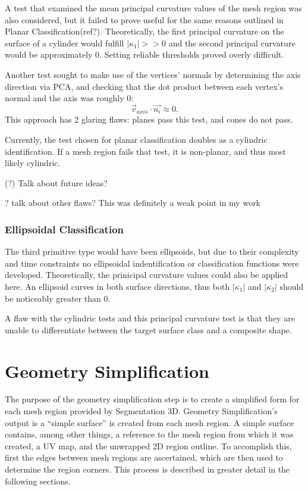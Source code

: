 A test that examined the mean principal curvature values of the mesh region was also considered, but it failed to prove useful for the same reasons outlined in Planar Classification(ref?).
Theoretically, the first principal curvature on the surface of a cylinder would fulfill $|\kappa_1| >> 0$ and the second principal curvature would be approximately 0.
Setting reliable thresholds proved overly difficult.

Another test sought to make use of the vertices' normals by determining the axis direction via PCA, and checking that the dot product between each vertex's normal and the axis was roughly 0:
\begin{equation}
	\vec{v}_{axis} \cdot \vec{n_i} \approx 0.
\end{equation}
This approach has 2 glaring flaws: planes pass this test, and cones do not pass.

Currently, the test chosen for planar classification doubles as a cylindric identification.
If a mesh region fails that test, it is non-planar, and thus most likely cylindric.

(?) Talk about future ideas?

? talk about other flaws? This was definitely a weak point in my work

\subsubsection{Ellipsoidal Classification}
The third primitive type would have been ellipsoids, but due to their complexity and time constraints no ellipsoidal indentification or classification functions were developed.
Theoretically, the prinicipal curvature values could also be applied here.
An ellipsoid curves in both surface directions, thus both $|\kappa_1|$ and $|\kappa_2|$ should be noticeably greater than 0.

A flaw with the cylindric tests and this principal curvature test is that they are unable to differentiate between the target surface class and a composite shape.

\section{Geometry Simplification}
The purpose of the geometry simplification step is to create a simplified form for each mesh region provided by Segmentation 3D.
Geometry Simplification's output is a ``simple surface'' is created from each mesh region.
A simple surface contains, among other things, a reference to the mesh region from which it was created, a UV map, and the unwrapped 2D region outline.
To accomplish this, first the edges between mesh regions are ascertained, which are then used to determine the region corners.
This process is described in greater detail in the following sections.

